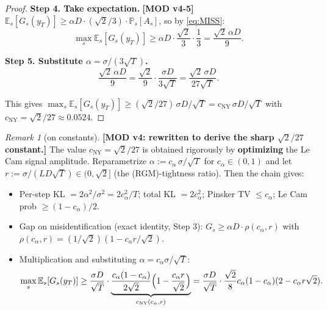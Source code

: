 \documentclass[11pt,a4paper]{article}
\theoremstyle{plain}
\theoremstyle{definition}
\theoremstyle{remark}
\newtheorem{remark}[theorem]{Remark}
\newcommand{\E}{\mathbb{E}}
\newcommand{\Prb}{\mathbb{P}}
\begin{document}
\begin{proof}
\textbf{Step 4. Take expectation.} \textbf{[MOD v4-5]} $\E_s[G_s(y_T)] \geq \alpha D \cdot (\sqrt 2/3) \cdot \Prb_s[A_s]$, so by \eqref{eq:MISS}:
\[
\max_s \E_s[G_s(y_T)] \geq \alpha D \cdot \frac{\sqrt 2}{3} \cdot \frac{1}{3} = \frac{\sqrt 2\, \alpha D}{9}.
\]

\textbf{Step 5. Substitute $\alpha = \sigma/(3\sqrt T)$.}
\[
\frac{\sqrt 2\, \alpha D}{9} = \frac{\sqrt 2}{9}\cdot \frac{\sigma D}{3\sqrt T} = \frac{\sqrt 2\, \sigma D}{27\sqrt T}.
\]

This gives $\max_s \E_s[G_s(y_T)] \geq (\sqrt 2/27)\,\sigma D/\sqrt T = c_\mathrm{NY}\,\sigma D/\sqrt T$ with $c_\mathrm{NY} = \sqrt 2/27 \approx 0.0524$.
\end{proof}

\begin{remark}[on constants]
\textbf{[MOD v4: rewritten to derive the sharp $\sqrt 2/27$ constant.]} The value $c_\mathrm{NY} = \sqrt 2/27$ is obtained rigorously by \textbf{optimizing} the Le Cam signal amplitude. Reparametrize $\alpha := c_\alpha\,\sigma/\sqrt T$ for $c_\alpha \in (0, 1)$ and let $r := \sigma/(LD\sqrt T) \in (0, \sqrt 2]$ (the (RGM)-tightness ratio). Then the chain gives:
\begin{itemize}
\item Per-step KL $= 2\alpha^2/\sigma^2 = 2c_\alpha^2/T$; total KL $= 2c_\alpha^2$; Pinsker TV $\leq c_\alpha$; Le Cam prob $\geq (1 - c_\alpha)/2$.
\item Gap on misidentification (exact identity, Step 3): $G_s \geq \alpha D \cdot \rho(c_\alpha, r)$ with $\rho(c_\alpha, r) = (1/\sqrt 2)(1 - c_\alpha r/\sqrt 2)$.
\item Multiplication and substituting $\alpha = c_\alpha \sigma/\sqrt T$:
\[
\max_s \E_s[G_s(y_T)] \geq \frac{\sigma D}{\sqrt T}\cdot \underbrace{\frac{c_\alpha(1-c_\alpha)}{2\sqrt 2}\Bigl(1 - \frac{c_\alpha r}{\sqrt 2}\Bigr)}_{c_\mathrm{NY}(c_\alpha, r)} = \frac{\sigma D}{\sqrt T}\cdot \frac{\sqrt 2}{8} c_\alpha(1-c_\alpha)(2 - c_\alpha r\sqrt 2).
\]
\end{itemize}


\end{remark}
\end{document}
